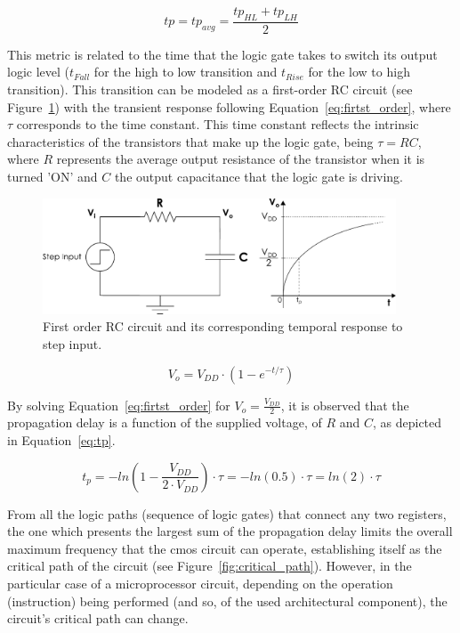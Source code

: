 \begin{equation}
    tp = tp_{avg} = \frac{tp_{HL}+tp_{LH}}{2}
    \label{eq:tp_avg}
\end{equation}

This metric is related to the time that the logic gate takes to switch its output logic level ($t_{Fall}$ for the high to low transition and $t_{Rise}$ for the low to high transition). This transition can be modeled as a first-order RC circuit (see Figure~\ref{fig:rc_circuit}) with the transient response following Equation~\ref{eq:firtst_order}, where $\tau$ corresponds to the time constant. This time constant reflects the intrinsic characteristics of the transistors that make up the logic gate, being $\tau=RC$, where $R$ represents the average output resistance of the transistor when it is turned 'ON' and $C$ the output capacitance that the logic gate is driving.


\begin{figure}[htb]
    \centering
    \includegraphics[width=105mm]{Figures/Background/rc_circuit.pdf}
    \caption{First order RC circuit and its corresponding temporal response to step input.}
    \label{fig:rc_circuit}
\end{figure}

\begin{equation}
    V_o=V_{DD} \cdot (1-e^{-t/\tau})
    \label{eq:firtst_order}
\end{equation}

By solving Equation~\ref{eq:firtst_order} for $V_o=\frac{V_{DD}}{2}$, it is observed that the propagation delay is a function of the supplied voltage, of $R$ and $C$, as depicted in Equation~\ref{eq:tp}.


\begin{equation}
    t_p=-ln\left(1-\frac{V_{DD}}{2 \cdot V_{DD}}\right)\cdot\tau=-ln(0.5)\cdot\tau=ln(2)\cdot\tau
    \label{eq:tp}
\end{equation}


From all the logic paths (sequence of logic gates) that connect any two registers, the one which presents the largest sum of the propagation delay limits the overall maximum frequency that the \acrshort{cmos} circuit can operate, establishing itself as the critical path of the circuit (see Figure~\ref{fig:critical_path}). However, in the particular case of a microprocessor circuit, depending on the operation (instruction) being performed (and so, of the used architectural component), the circuit's critical path can change.

